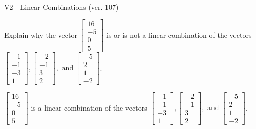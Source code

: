 \begin{exercise}
  \begin{exerciseTitle}V2 - Linear Combinations (ver. 107)\end{exerciseTitle}
  \begin{exerciseStatement}
    Explain why the vector \(\left[\begin{array}{c}
16 \\
-5 \\
0 \\
5
\end{array}\right]\)  is or is not a linear 
	combination of the vectors \(\left[\begin{array}{c}
-1 \\
-1 \\
-3 \\
1
\end{array}\right] , \left[\begin{array}{c}
-2 \\
-1 \\
3 \\
2
\end{array}\right] , \text{ and } \left[\begin{array}{c}
-5 \\
2 \\
1 \\
-2
\end{array}\right]\).
	


  \end{exerciseStatement}
  \begin{exerciseAnswer}
   \(\left[\begin{array}{c}
16 \\
-5 \\
0 \\
5
\end{array}\right]\) 
  	 is  
	a linear combination of the vectors \(\left[\begin{array}{c}
-1 \\
-1 \\
-3 \\
1
\end{array}\right] , \left[\begin{array}{c}
-2 \\
-1 \\
3 \\
2
\end{array}\right] , \text{ and } \left[\begin{array}{c}
-5 \\
2 \\
1 \\
-2
\end{array}\right]\).

	
  


  \end{exerciseAnswer}
\end{exercise}